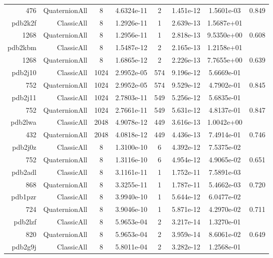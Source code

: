 \begin{xltabular}{\textwidth}{r|rcS[table-format=1.4e+2]cS[table-format=1.3e+2]S[table-format=1.4e+2]S[table-format=-1.3]}
476 & QuaternionAll & 8 & 4.6324e-11 & 2 & 1.451e-12 & 1.5601e-03 & 0.849\\  \addlinespace
{\color{red} pdb2k2f } & ClassicAll & 8 & 1.2926e-11 & 1 & 2.639e-13 & 1.5687e+01 & \\
1268 & QuaternionAll & 8 & 1.2956e-11 & 1 & 2.818e-13 & 9.5350e+00 & 0.608\\  \addlinespace
{\color{red} pdb2kbm } & ClassicAll & 8 & 1.5487e-12 & 2 & 2.165e-13 & 1.2158e+01 & \\
1268 & QuaternionAll & 8 & 1.6865e-12 & 2 & 2.226e-13 & 7.7655e+00 & 0.639\\  \addlinespace
{\color{red} pdb2j10 } & ClassicAll & 1024 & 2.9952e-05 & 574 & 9.196e-12 & 5.6669e-01 & \\
752 & QuaternionAll & 1024 & 2.9952e-05 & 574 & 9.529e-12 & 4.7902e-01 & 0.845\\  \addlinespace
{\color{red} pdb2j11 } & ClassicAll & 1024 & 2.7803e-11 & 549 & 5.256e-12 & 5.6835e-01 & \\
752 & QuaternionAll & 1024 & 2.7661e-11 & 549 & 5.631e-12 & 4.8137e-01 & 0.847\\  \addlinespace
{\color{red} pdb2lwa } & ClassicAll & 2048 & 4.9078e-12 & 449 & 3.616e-13 & 1.0042e+00 & \\
432 & QuaternionAll & 2048 & 4.0818e-12 & 449 & 4.436e-13 & 7.4914e-01 & 0.746\\  \addlinespace
pdb2j0z & ClassicAll & 8 & 1.3100e-10 & 6 & 4.392e-12 & 7.5375e-02 & \\
752 & QuaternionAll & 8 & 1.3116e-10 & 6 & 4.954e-12 & 4.9065e-02 & 0.651\\  \addlinespace
pdb2adl & ClassicAll & 8 & 3.1161e-11 & 1 & 1.752e-11 & 7.5891e-03 & \\
868 & QuaternionAll & 8 & 3.3255e-11 & 1 & 1.787e-11 & 5.4662e-03 & 0.720\\  \addlinespace
pdb1pzr & ClassicAll & 8 & 3.9940e-10 & 1 & 5.644e-12 & 6.0477e-02 & \\
724 & QuaternionAll & 8 & 3.9046e-10 & 1 & 5.871e-12 & 4.2970e-02 & 0.711\\  \addlinespace
pdb2lzf & ClassicAll & 8 & 5.9653e-04 & 2 & 3.217e-14 & 1.3270e-01 & \\
820 & QuaternionAll & 8 & 5.9653e-04 & 2 & 3.959e-14 & 8.6061e-02 & 0.649\\  \addlinespace
pdb2g9j & ClassicAll & 8 & 5.8011e-04 & 2 & 3.282e-12 & 1.2568e-01 & \\

\end{xltabular}
